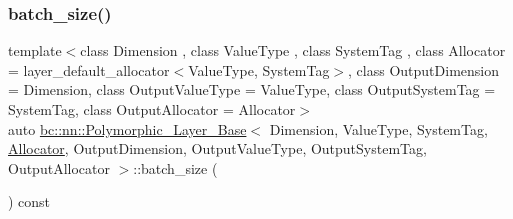\mbox{\label{structbc_1_1nn_1_1Polymorphic__Layer__Base_a107ffea414142eb7be7aa45f0387f966}} 
\subsubsection{\texorpdfstring{batch\+\_\+size()}{batch\_size()}\hspace{0.1cm}{\footnotesize\ttfamily [2/2]}}
{\footnotesize\ttfamily template$<$class Dimension , class Value\+Type , class System\+Tag , class Allocator  = layer\+\_\+default\+\_\+allocator$<$\+Value\+Type, System\+Tag$>$, class Output\+Dimension  = Dimension, class Output\+Value\+Type  = Value\+Type, class Output\+System\+Tag  = System\+Tag, class Output\+Allocator  = Allocator$>$ \\
auto \hyperlink{structbc_1_1nn_1_1Polymorphic__Layer__Base}{bc\+::nn\+::\+Polymorphic\+\_\+\+Layer\+\_\+\+Base}$<$ Dimension, Value\+Type, System\+Tag, \hyperlink{classbc_1_1allocators_1_1Allocator}{Allocator}, Output\+Dimension, Output\+Value\+Type, Output\+System\+Tag, Output\+Allocator $>$\+::batch\+\_\+size (\begin{DoxyParamCaption}{ }\end{DoxyParamCaption}) const\hspace{0.3cm}{\ttfamily [inline]}}

\mbox{\label{structbc_1_1nn_1_1Polymorphic__Layer__Base_a362477a099ec16eeafcda0527ca711b2}} 
